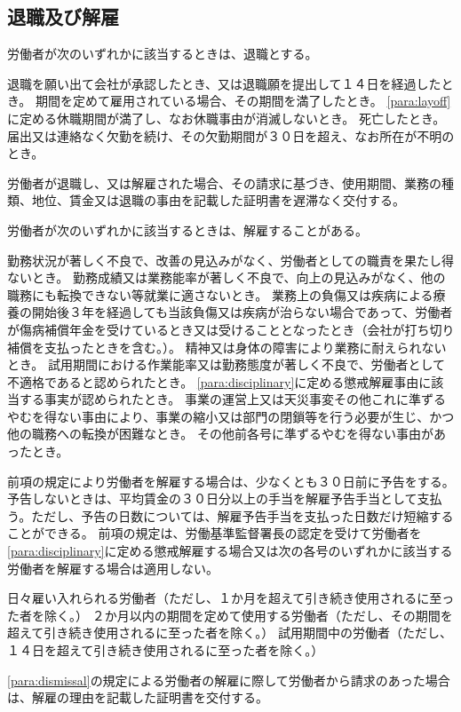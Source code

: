 \documentclass[10pt,a4paper,uplatex]{jsarticle}
\begin{document}
\subsection{退職及び解雇}

労働者が次のいずれかに該当するときは、退職とする。
\begin{enumerate}
    \itm 退職を願い出て会社が承認したとき、又は退職願を提出して１４日を経過したとき。
    \itm 期間を定めて雇用されている場合、その期間を満了したとき。
    \itm \ref{para:layoff}に定める休職期間が満了し、なお休職事由が消滅しないとき。
    \itm 死亡したとき。
    \itm 届出又は連絡なく欠勤を続け、その欠勤期間が３０日を超え、なお所在が不明のとき。
\end{enumerate}
\term
労働者が退職し、又は解雇された場合、その請求に基づき、使用期間、業務の種類、地位、賃金又は退職の事由を記載した証明書を遅滞なく交付する。

労働者が次のいずれかに該当するときは、解雇することがある。
\label{para:dismissal}
\begin{enumerate}
    \itm 勤務状況が著しく不良で、改善の見込みがなく、労働者としての職責を果たし得ないとき。
    \itm 勤務成績又は業務能率が著しく不良で、向上の見込みがなく、他の職務にも転換できない等就業に適さないとき。
    \itm 業務上の負傷又は疾病による療養の開始後３年を経過しても当該負傷又は疾病が治らない場合であって、労働者が傷病補償年金を受けているとき又は受けることとなったとき（会社が打ち切り補償を支払ったときを含む。）。
    \itm 精神又は身体の障害により業務に耐えられないとき。
    \itm 試用期間における作業能率又は勤務態度が著しく不良で、労働者として不適格であると認められたとき。
    \itm \ref{para:disciplinary}に定める懲戒解雇事由に該当する事実が認められたとき。
    \itm 事業の運営上又は天災事変その他これに準ずるやむを得ない事由により、事業の縮小又は部門の閉鎖等を行う必要が生じ、かつ他の職務への転換が困難なとき。
    \itm その他前各号に準ずるやむを得ない事由があったとき。
\end{enumerate}
\term
前項の規定により労働者を解雇する場合は、少なくとも３０日前に予告をする。予告しないときは、平均賃金の３０日分以上の手当を解雇予告手当として支払う。ただし、予告の日数については、解雇予告手当を支払った日数だけ短縮することができる。
\term
前項の規定は、労働基準監督署長の認定を受けて労働者を\ref{para:disciplinary}に定める懲戒解雇する場合又は次の各号のいずれかに該当する労働者を解雇する場合は適用しない。
\begin{enumerate}
    \itm 日々雇い入れられる労働者（ただし、１か月を超えて引き続き使用されるに至った者を除く。）
    \itm ２か月以内の期間を定めて使用する労働者（ただし、その期間を超えて引き続き使用されるに至った者を除く。）
    \itm 試用期間中の労働者（ただし、１４日を超えて引き続き使用されるに至った者を除く。）
\end{enumerate}
\term
\ref{para:dismissal}の規定による労働者の解雇に際して労働者から請求のあった場合は、解雇の理由を記載した証明書を交付する。
\end{document}
